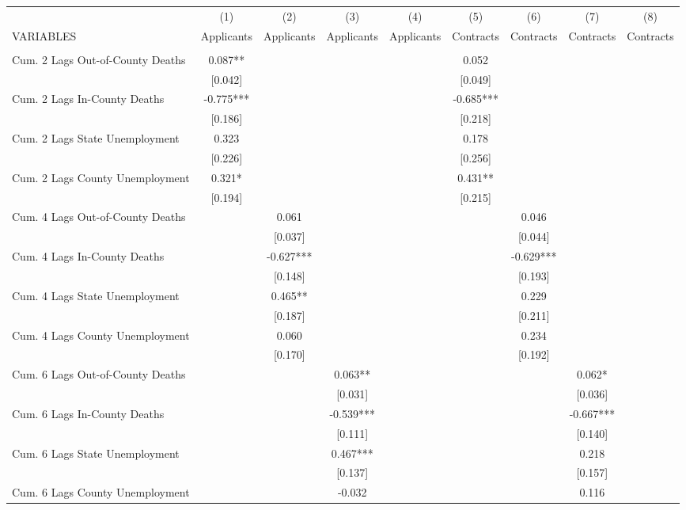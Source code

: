 \documentclass[]{article}
\begin{document}
\begin{tabular}{lcccccccc} \hline
 & (1) & (2) & (3) & (4) & (5) & (6) & (7) & (8) \\
VARIABLES & Applicants & Applicants & Applicants & Applicants & Contracts & Contracts & Contracts & Contracts \\ \hline
 &  &  &  &  &  &  &  &  \\
Cum. 2 Lags Out-of-County Deaths & 0.087** &  &  &  & 0.052 &  &  &  \\
 & [0.042] &  &  &  & [0.049] &  &  &  \\
Cum. 2 Lags In-County Deaths & -0.775*** &  &  &  & -0.685*** &  &  &  \\
 & [0.186] &  &  &  & [0.218] &  &  &  \\
Cum. 2 Lags State Unemployment & 0.323 &  &  &  & 0.178 &  &  &  \\
 & [0.226] &  &  &  & [0.256] &  &  &  \\
Cum. 2 Lags County Unemployment & 0.321* &  &  &  & 0.431** &  &  &  \\
 & [0.194] &  &  &  & [0.215] &  &  &  \\
Cum. 4 Lags  Out-of-County Deaths &  & 0.061 &  &  &  & 0.046 &  &  \\
 &  & [0.037] &  &  &  & [0.044] &  &  \\
Cum. 4 Lags  In-County Deaths &  & -0.627*** &  &  &  & -0.629*** &  &  \\
 &  & [0.148] &  &  &  & [0.193] &  &  \\
Cum. 4 Lags  State Unemployment &  & 0.465** &  &  &  & 0.229 &  &  \\
 &  & [0.187] &  &  &  & [0.211] &  &  \\
Cum. 4 Lags  County Unemployment &  & 0.060 &  &  &  & 0.234 &  &  \\
 &  & [0.170] &  &  &  & [0.192] &  &  \\
Cum. 6 Lags  Out-of-County Deaths &  &  & 0.063** &  &  &  & 0.062* &  \\
 &  &  & [0.031] &  &  &  & [0.036] &  \\
Cum. 6 Lags  In-County Deaths &  &  & -0.539*** &  &  &  & -0.667*** &  \\
 &  &  & [0.111] &  &  &  & [0.140] &  \\
Cum. 6 Lags  State Unemployment &  &  & 0.467*** &  &  &  & 0.218 &  \\
 &  &  & [0.137] &  &  &  & [0.157] &  \\
Cum. 6 Lags  County Unemployment &  &  & -0.032 &  &  &  & 0.116 &  \\

\end{tabular}
\end{document}
